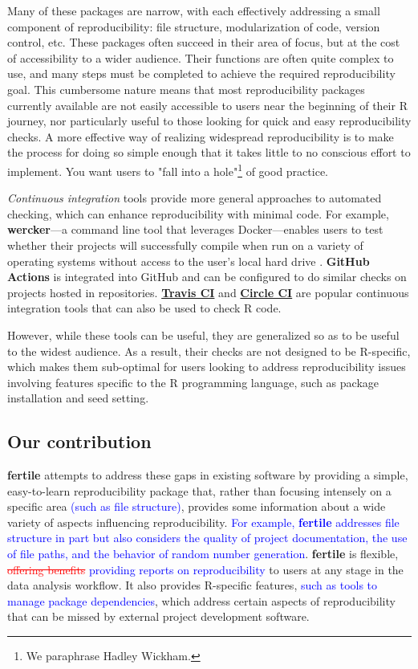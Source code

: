 \documentclass[APA,LATO1COL]{WileyNJD-v2}\usepackage[]{graphicx}\usepackage[]{color}
\newcommand{\R}{\textsf{R}\xspace}
\newcommand{\pkg}[1]{\textbf{#1}}
\begin{document}
Many of these packages are narrow, with each effectively addressing a small component of reproducibility: file structure, modularization of code, version control, etc. These packages often  succeed in their area of focus, but at the cost of accessibility to a wider audience. Their functions are often quite complex to use, and many steps must be completed to achieve the required reproducibility goal. This cumbersome nature means that most reproducibility packages currently available are not easily accessible to users near the beginning of their \R journey, nor particularly useful to those looking for quick and easy reproducibility checks.
A more effective way of realizing widespread reproducibility is to make the process for doing so simple enough that it takes little to no conscious effort to implement. You want users to "fall into a hole"\footnote{We paraphrase Hadley Wickham.} of good practice. 

\emph{Continuous integration} tools provide more general approaches to automated checking, which can enhance reproducibility with minimal code. For example, \pkg{wercker}---a command line tool that leverages Docker---enables users to test whether their projects will successfully compile when run on a variety of operating systems without access to the user's local hard drive \citep{wercker}. \pkg{GitHub Actions} is integrated into GitHub and can be configured to do similar checks on projects hosted in repositories. \href{https://travis-ci.com}{\pkg{Travis CI}} and \href{https://circleci.com/product}{\pkg{Circle CI}} are popular continuous integration tools that can also be used to check \R code. 

However, while these tools can be useful, they are generalized so as to be useful to the widest audience. As a result, their checks are not designed to be \R-specific, which makes them sub-optimal for users looking to address reproducibility issues involving features specific to the \R programming language, such as package installation and seed setting.

\subsection{Our contribution}

\pkg{fertile} attempts to address these gaps in existing software by providing a simple, easy-to-learn reproducibility package that, rather than focusing intensely on a specific area \textcolor{blue}{(such as file structure)}, provides some information about a wide variety of aspects influencing reproducibility. \textcolor{blue}{For example, \pkg{fertile} addresses file structure in part but also considers the quality of project documentation, the use of file paths, and the behavior of random number generation}. \pkg{fertile} is flexible, \textcolor{red}{\st{offering benefits}} \textcolor{blue}{providing reports on reproducibility} to users at any stage in the data analysis workflow.
It also provides \R-specific features, \textcolor{blue}{such as tools to manage package dependencies}, which address certain aspects of reproducibility that can be missed by external project development software.
\end{document}
